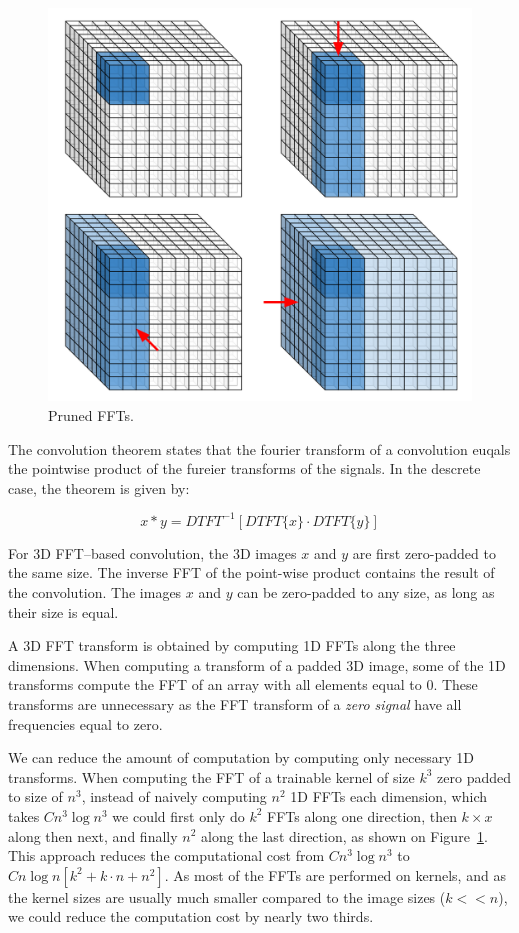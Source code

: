 \documentclass[conference]{IEEEtran}
\begin{document}
  \begin{figure}
    \begin{center}
      \includegraphics[width=0.55\columnwidth]{fig/pruned_ffts.pdf}
    \end{center}
    \caption{Pruned FFTs.}
    \label{fig:pruned_ffts}
  \end{figure}

  The convolution theorem states that the fourier transform of a
  convolution euqals the pointwise product of the fureier transforms
  of the signals.  In the descrete case, the theorem is given by:

  $$x \ast y = DTFT^{-1}[DTFT\{x\} \cdot DTFT\{y\}]$$

  For 3D FFT--based convolution, the 3D images $x$ and $y$ are first
  zero-padded to the same size.  The inverse FFT of the point-wise
  product contains the result of the convolution.  The images $x$ and
  $y$ can be zero-padded to any size, as long as their size is equal.

  A 3D FFT transform is obtained by computing 1D FFTs along the three
  dimensions.  When computing a transform of a padded 3D image, some
  of the 1D transforms compute the FFT of an array with all elements
  equal to $0$.  These transforms are unnecessary as the FFT transform
  of a \emph{zero signal} have all frequencies equal to zero.

  We can reduce the amount of computation by computing only necessary
  1D transforms.  When computing the FFT of a trainable kernel of size
  $k^3$ zero padded to size of $n^3$, instead of naively computing
  $n^2$ 1D FFTs each dimension, which takes $C n^3 \log n^3$ we could
  first only do $k^2$ FFTs along one direction, then $k \times x$
  along then next, and finally $n^2$ along the last direction, as
  shown on Figure~\ref{fig:pruned_ffts}.  This approach reduces the
  computational cost from $C n^3 \log n^3$ to $C n\log n[k^2 + k \cdot
    n + n^2]$.  As most of the FFTs are performed on kernels, and as
  the kernel sizes are usually much smaller compared to the image
  sizes ($k << n$), we could reduce the computation cost by nearly two
  thirds.
\end{document}
